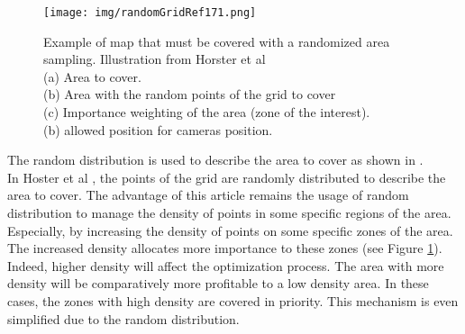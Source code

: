 \begin{figure}[t!]
\begin{center}
   \texttt{[image: img/randomGridRef171.png]}
  \caption{Example of  map that must be  covered with a randomized area sampling. Illustration from Horster et al \citep{171*horster2006} \\
  (a) Area  to cover.\\ 
  (b) Area with the random points of the grid to cover \\
  (c) Importance weighting of the area (zone of the interest).\\  
  (b) allowed position for cameras position.}\label{fig:randomGridRef171}
  \endminipage\hfill
  \end{center}
\end{figure}

 The random distribution is used to describe the area to cover as  shown in \cite{83*van2009,171*horster2006}. \\
In Hoster et al \citep{171*horster2006}, the points of the grid are randomly distributed to describe the area to cover. The advantage of this article remains the usage of random distribution to manage the density of points in some specific regions of the area. Especially, by increasing the density of points on some specific zones of the area. The increased density allocates more importance to these zones (see Figure \ref{fig:randomGridRef171}).\\
Indeed, higher density will affect the optimization process. The area with more density will be comparatively more profitable to a low density area. In these cases, the zones with high density are covered in priority. This mechanism is even simplified due to the random distribution.

